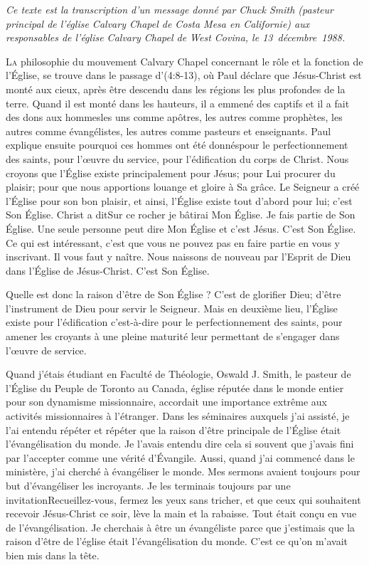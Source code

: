 \epigraph{\textit{%
Ce texte est la transcription d'un message donné par Chuck Smith (pasteur principal de l'église Calvary Chapel de
Costa Mesa en Californie) aux responsables de l'église Calvary Chapel de West Covina, le 13~décembre~1988.
}}{}

\lettrine{L}{a} philosophie du mouvement Calvary Chapel concernant le rôle et la fonction de l’Église, se trouve dans le passage
d'(4:8-13), où Paul déclare que Jésus-Christ est monté aux cieux, après être descendu dans les régions les
plus profondes de la terre. Quand il est monté dans les hauteurs, il a emmené des captifs et il a fait des dons aux
hommes\frcolon les uns comme apôtres, les autres comme prophètes, les autres comme évangélistes, les autres comme
pasteurs et enseignants. Paul explique ensuite pourquoi ces hommes ont été donnés\frcolon pour le perfectionnement des
saints, pour l’œuvre du service, pour l’édification du corps de Christ. Nous croyons que l’Église existe principalement
pour Jésus; pour Lui procurer du plaisir; pour que nous apportions louange et gloire à Sa grâce. Le Seigneur a créé
l’Église pour son bon plaisir, et ainsi, l’Église existe tout d’abord pour lui; c’est Son Église. Christ a dit\frcolon\og Sur ce rocher
je bâtirai Mon Église\fg{}. Je fais partie de Son Église. Une seule personne peut dire \og Mon Église\fg{} et c’est Jésus. C’est
Son Église. Ce qui est intéressant, c’est que vous ne pouvez pas en faire partie en vous y inscrivant. Il vous faut y
naître. Nous naissons de nouveau par l’Esprit de Dieu dans l’Église de Jésus-Christ. C’est Son Église.

Quelle est donc la raison d'être de Son Église ? C'est de glorifier Dieu; d’être l’instrument de Dieu pour servir le
Seigneur. Mais en deuxième lieu, l’Église existe pour l’édification c'est-à-dire pour le perfectionnement des saints, pour
amener les croyants à une pleine maturité leur permettant de s’engager dans l’œuvre de service.

Quand j’étais étudiant en Faculté de Théologie, Oswald J. Smith, le pasteur de l’Église du Peuple de Toronto au
Canada, église réputée dans le monde entier pour son dynamisme missionnaire, accordait une importance extrême
aux activités missionnaires à l’étranger. Dans les séminaires auxquels j’ai assisté, je l’ai entendu répéter et répéter
que la raison d'être principale de l’Église était l’évangélisation du monde. Je l’avais entendu dire cela si souvent que
j’avais fini par l’accepter comme une vérité d’Évangile. Aussi, quand j’ai commencé dans le ministère, j’ai cherché à
évangéliser le monde. Mes sermons avaient toujours pour but d'évangéliser les incroyants. Je les terminais toujours
par une invitation\frcolon\og Recueillez-vous, fermez les yeux sans tricher, et que ceux qui souhaitent recevoir Jésus-Christ ce
soir, lève la main et la rabaisse\fg{}. Tout était conçu en vue de l’évangélisation. Je cherchais à être un évangéliste parce
que j’estimais que la raison d'être de l’église était l’évangélisation du monde. C'est ce qu'on m'avait bien mis dans la
tête.

